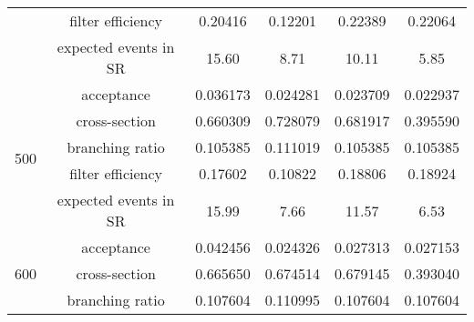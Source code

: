 \begin{table}[htbp]
\begin{center}
{\begin{tabular}{cccccc}
                                         & filter efficiency     & 0.20416                                    & 0.12201                                        & 0.22389                                    & 0.22064\\
                                         & expected events in SR & 15.60                                      & 8.71                                           & 10.11                                      & 5.85\\
                \hline
                \multirow{5}{*}{500}     & acceptance            & 0.036173                                   & 0.024281                                       & 0.023709                                   & 0.022937\\
                                         & cross-section         & 0.660309                                   & 0.728079                                       & 0.681917                                   & 0.395590\\
                                         & branching ratio       & 0.105385                                   & 0.111019                                       & 0.105385                                   & 0.105385\\
                                         & filter efficiency     & 0.17602                                    & 0.10822                                        & 0.18806                                    & 0.18924\\
                                         & expected events in SR & 15.99                                      & 7.66                                           & 11.57                                      & 6.53\\
                \hline
                \multirow{5}{*}{600}     & acceptance            & 0.042456                                   & 0.024326                                       & 0.027313                                   & 0.027153\\
                                         & cross-section         & 0.665650                                   & 0.674514                                       & 0.679145                                   & 0.393040\\
                                         & branching ratio       & 0.107604                                   & 0.110995                                       & 0.107604                                   & 0.107604\\

\end{tabular}}
\end{center}
\end{table}
